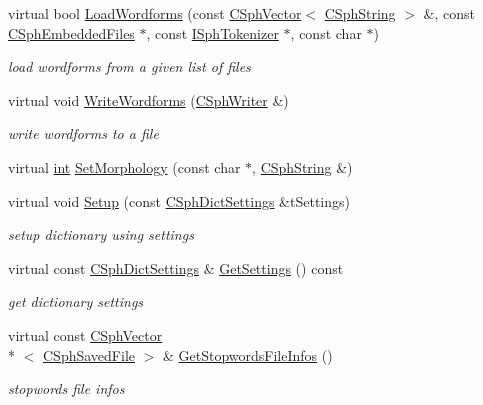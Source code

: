 \begin{DoxyCompactItemize}
virtual bool \hyperlink{classCSphStopwordBuilderDict_a71eb5fdb2bae263735fe959721a761f2}{Load\-Wordforms} (const \hyperlink{classCSphVector}{C\-Sph\-Vector}$<$ \hyperlink{structCSphString}{C\-Sph\-String} $>$ \&, const \hyperlink{structCSphEmbeddedFiles}{C\-Sph\-Embedded\-Files} $\ast$, const \hyperlink{classISphTokenizer}{I\-Sph\-Tokenizer} $\ast$, const char $\ast$)
\begin{DoxyCompactList}\small\item\em load wordforms from a given list of files \end{DoxyCompactList}\item 
virtual void \hyperlink{classCSphStopwordBuilderDict_aaa02664e1d2e0a048cc58184514e5791}{Write\-Wordforms} (\hyperlink{classCSphWriter}{C\-Sph\-Writer} \&)
\begin{DoxyCompactList}\small\item\em write wordforms to a file \end{DoxyCompactList}\item 
virtual \hyperlink{sphinxexpr_8cpp_a4a26e8f9cb8b736e0c4cbf4d16de985e}{int} \hyperlink{classCSphStopwordBuilderDict_a2f779795842896ed17ac536dbee12830}{Set\-Morphology} (const char $\ast$, \hyperlink{structCSphString}{C\-Sph\-String} \&)
\item 
virtual void \hyperlink{classCSphStopwordBuilderDict_a4aa9573dfd94c3dfab082aa9ad0d8347}{Setup} (const \hyperlink{structCSphDictSettings}{C\-Sph\-Dict\-Settings} \&t\-Settings)
\begin{DoxyCompactList}\small\item\em setup dictionary using settings \end{DoxyCompactList}\item 
virtual const \hyperlink{structCSphDictSettings}{C\-Sph\-Dict\-Settings} \& \hyperlink{classCSphStopwordBuilderDict_ae6167a0ff8855e713c37a2d3aa07c744}{Get\-Settings} () const 
\begin{DoxyCompactList}\small\item\em get dictionary settings \end{DoxyCompactList}\item 
virtual const \hyperlink{classCSphVector}{C\-Sph\-Vector}\\*
$<$ \hyperlink{structCSphSavedFile}{C\-Sph\-Saved\-File} $>$ \& \hyperlink{classCSphStopwordBuilderDict_acd10d2cdfcb80deee00aa320941bcc85}{Get\-Stopwords\-File\-Infos} ()
\begin{DoxyCompactList}\small\item\em stopwords file infos \end{DoxyCompactList}\item 

\end{DoxyCompactItemize}
